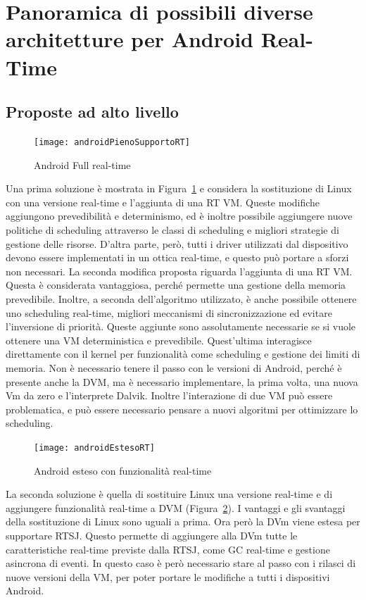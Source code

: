 \section{Panoramica di possibili diverse architetture per Android Real-Time}
\subsection{Proposte ad alto livello}
\begin{figure}[h]
	\centering
	\texttt{[image: androidPienoSupportoRT]}
	\caption{Android Full real-time}
	\label{fig:androidpienosupportort}
\end{figure}
Una prima soluzione è mostrata in Figura~\ref{fig:androidpienosupportort} e considera la sostituzione di Linux con una versione real-time e l'aggiunta di una RT VM. Queste modifiche aggiungono prevedibilità e determinismo, ed è inoltre possibile aggiungere nuove politiche di scheduling attraverso le classi di scheduling e migliori strategie di gestione delle risorse. D'altra parte, però, tutti i driver utilizzati dal dispositivo devono essere implementati in un ottica real-time, e questo può portare a sforzi non necessari. La seconda modifica proposta riguarda l'aggiunta di una RT VM. Questa è considerata vantaggiosa, perché permette una gestione della memoria prevedibile. Inoltre, a seconda dell'algoritmo utilizzato, è anche possibile ottenere uno scheduling real-time, migliori meccanismi di sincronizzazione ed evitare l'inversione di priorità. Queste aggiunte sono assolutamente necessarie se si vuole ottenere una VM deterministica e prevedibile. Quest'ultima interagisce direttamente con il kernel per funzionalità come scheduling e gestione dei limiti di memoria. Non è necessario tenere il passo con le versioni di Android, perché è presente anche la DVM, ma è necessario implementare, la prima volta, una nuova Vm da zero e l'interprete Dalvik. Inoltre l'interazione di due VM può essere problematica, e può essere necessario pensare a nuovi algoritmi per ottimizzare lo scheduling.

\begin{figure}[h]
	\centering
	\texttt{[image: androidEstesoRT]}
	\caption{Android esteso con funzionalità real-time}
	\label{fig:androidestesort}
\end{figure}
La seconda soluzione è quella di sostituire Linux una versione real-time e di aggiungere funzionalità real-time a DVM (Figura~\ref{fig:androidestesort}). I vantaggi e gli svantaggi della sostituzione di Linux sono uguali a prima. Ora però la DVm viene estesa per supportare RTSJ. Questo permette di aggiungere alla DVm tutte le caratteristiche real-time previste dalla RTSJ, come GC real-time e gestione asincrona di eventi. In questo caso è però necessario stare al passo con i rilasci di nuove versioni della VM, per poter portare le modifiche a tutti i dispositivi Android.

